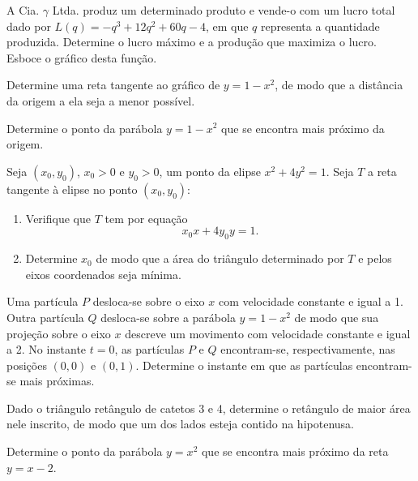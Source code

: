 \begin{exercicio}[23]
A Cia. $\gamma$ Ltda. produz um determinado produto e vende-o com um lucro total dado por $L(q) = -q^3 + 12q^2 + 60q - 4$, em que $q$ representa a quantidade produzida. Determine o lucro máximo e a produção que maximiza o lucro. Esboce o gráfico desta função.
\end{exercicio}

\begin{exercicio}[24]
Determine uma reta tangente ao gráfico de $y = 1 - x^2$, de modo que a distância da origem a ela seja a menor possível.
\end{exercicio}

\begin{exercicio}[25]
Determine o ponto da parábola $y = 1 - x^2$ que se encontra mais próximo da origem.
\end{exercicio}

\begin{exercicio}[26]
Seja $(x_0, y_0)$, $x_0 > 0$ e $y_0 > 0$, um ponto da elipse $x^2 + 4y^2 = 1$. Seja $T$ a reta tangente à elipse no ponto $(x_0, y_0)$:
\begin{enumerate}[label=\alph*)]
    \item Verifique que $T$ tem por equação
    \[
    x_0 x + 4y_0 y = 1.
    \]
    \item Determine $x_0$ de modo que a área do triângulo determinado por $T$ e pelos eixos coordenados seja mínima.
\end{enumerate}
\end{exercicio}

\begin{exercicio}[27]
Uma partícula $P$ desloca-se sobre o eixo $x$ com velocidade constante e igual a 1. Outra partícula $Q$ desloca-se sobre a parábola $y = 1 - x^2$ de modo que sua projeção sobre o eixo $x$ descreve um movimento com velocidade constante e igual a 2. No instante $t = 0$, as partículas $P$ e $Q$ encontram-se, respectivamente, nas posições $(0, 0)$ e $(0, 1)$. Determine o instante em que as partículas encontram-se mais próximas.
\end{exercicio}

\begin{exercicio}[28]
Dado o triângulo retângulo de catetos 3 e 4, determine o retângulo de maior área nele inscrito, de modo que um dos lados esteja contido na hipotenusa.
\end{exercicio}

\begin{exercicio}[29]
Determine o ponto da parábola $y = x^2$ que se encontra mais próximo da reta $y = x - 2$.
\end{exercicio}

